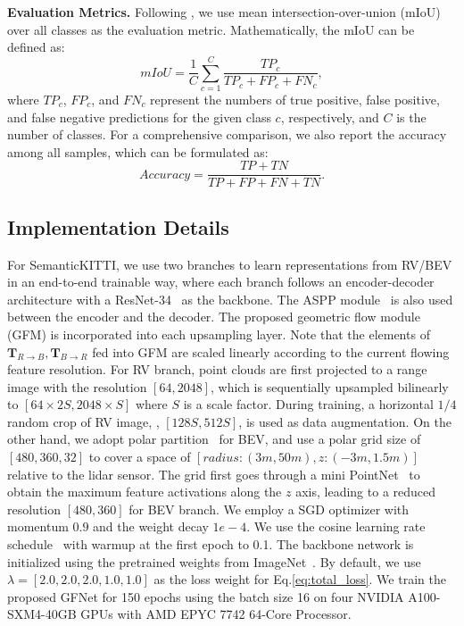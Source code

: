 \textbf{Evaluation Metrics.}
Following \cite{behley2019semantickitti}, we use mean intersection-over-union (mIoU) over all classes as the evaluation metric. Mathematically, the mIoU can be defined as: 
\begin{equation}
mIoU=\frac{1}{C}\sum_{c=1}^C\frac{TP_c}{TP_c+FP_c+FN_c},
\label{mIoU}
\end{equation}
where $TP_c$, $FP_c$, and $FN_c$ represent the numbers of true positive, false positive, and false negative predictions for the given class $c$, respectively, and $C$ is the number of classes. For a comprehensive comparison, we also report the accuracy among all samples, which can be formulated as:
\begin{equation}
Accuracy=\frac{TP+TN}{TP+FP+FN+TN}.
\label{acc}
\end{equation}

\subsection{Implementation Details}
\label{sec:imple}
For SemanticKITTI, we use two branches to learn representations from RV/BEV in an end-to-end trainable way, where each branch follows an encoder-decoder architecture with a ResNet-34~\citep{he2016deep} as the backbone. The ASPP module~\citep{chen2017rethinking} is also used between the encoder and the decoder. The proposed geometric flow module (GFM) is incorporated into each upsampling layer. Note that the elements of $\mathbf{T}_{R\rightarrow B}, \mathbf{T}_{B\rightarrow R}$ fed into GFM are scaled linearly according to the current flowing feature resolution. For RV branch, point clouds are first projected to a range image with the resolution $[64, 2048]$, which is sequentially upsampled bilinearly to $[64\times2S, 2048\times S]$ where $S$ is a scale factor. During training, a horizontal $1/4$ random crop of RV image, \ie, $[128S, 512S]$, is used as data augmentation. On the other hand, we adopt polar partition~\citep{zhang2020polarnet} for BEV, and use a polar grid size of $[480, 360, 32]$ to cover a space of $[radius: (3m, 50m), z: (-3m,1.5m)]$ relative to the lidar sensor. The grid first goes through a mini PointNet~\citep{qi2017pointnet} to obtain the maximum feature activations along the $z$ axis, leading to a reduced resolution $[480, 360]$ for BEV branch. We employ a SGD optimizer with momentum $0.9$ and the weight decay $1e-4$. We use the cosine learning rate schedule~\citep{loshchilov2016sgdr} with warmup at the first epoch to 0.1. The backbone network is initialized using the pretrained weights from ImageNet~\citep{deng2009imagenet}. By default, we use $\lambda=[2.0,2.0,2.0,1.0,1.0]$ as the loss weight for Eq.\ref{eq:total_loss}. We train the proposed GFNet for 150 epochs using the batch size 16 on four NVIDIA A100-SXM4-40GB GPUs with AMD EPYC 7742 64-Core Processor.

